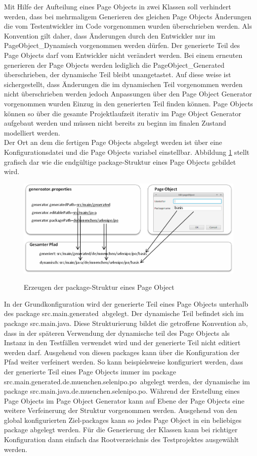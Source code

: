 Mit Hilfe der Aufteilung eines Page Objects in zwei Klassen soll verhindert werden, dass bei mehrmaligem Generieren des gleichen Page Objects Änderungen die vom Testentwickler im Code vorgenommen wurden überschrieben werden. Als Konvention gilt daher, dass Änderungen durch den Entwickler nur im PageObject\_Dynamisch vorgenommen werden dürfen. Der generierte Teil des Page Objects darf vom Entwickler nicht verändert werden.
Bei einem erneuten generieren der Page Objects werden lediglich die PageObject\_Generated überschrieben, der dynamische Teil bleibt unangetastet.
Auf diese weise ist sichergestellt, dass Änderungen die im dynamischen Teil vorgenommen werden nicht überschrieben werden jedoch Anpassungen über den Page Object Generator vorgenommen wurden Einzug in den generierten Teil finden können.
Page Objects können so über die gesamte Projektlaufzeit iterativ im Page Object Generator aufgebaut werden und müssen nicht bereits zu beginn im finalen Zustand modelliert werden.\\
Der Ort an dem die fertigen Page Objects abgelegt werden ist über eine Konfigurationsdatei und die Page Objects variabel einstellbar. 
Abbildung \ref{fig:packagepath} stellt grafisch dar wie die endgültige package-Struktur eines Page Objects gebildet wird.
\begin{figure}[htb]
  \centering  
  \includegraphics[scale=0.8]{img/packagePath.png}\\
  \caption{Erzeugen der package-Struktur eines Page Object}
  \label{fig:packagepath}
\end{figure}
In der Grundkonfiguration wird der generierte Teil eines Page Objects unterhalb des package \grq src.main.generated\grq\ abgelegt. Der dynamische Teil befindet sich im package \grq src.main.java\grq.
Diese Strukturierung bildet die getroffene Konvention ab, dass in der späteren Verwendung der dynamische teil des Page Objects als Instanz in den Testfällen verwendet wird und der generierte Teil nicht editiert werden darf.
Ausgehend von diesen packages kann über die Konfiguration der Pfad weiter verfeinert werden. So kann beispielsweise konfiguriert werden, dass der generierte Teil eines Page Objects immer im package \grq src.main.generated.de.muenchen.selenipo.po\grq\ abgelegt werden, der dynamische im package \grq src.main.java.de.muenchen.selenipo.po\grq.
Während der Erstellung eines Page Objects im Page Object Generator kann auf Ebene der Page Objects eine weitere Verfeinerung der Struktur vorgenommen werden. Ausgehend von den global konfigurierten Ziel-packages kann so jedes Page Object in ein beliebiges package abgelegt werden.
Für die Generierung der Klassen kann bei richtiger Konfiguration dann einfach das Rootverzeichnis des Testprojektes ausgewählt werden.

